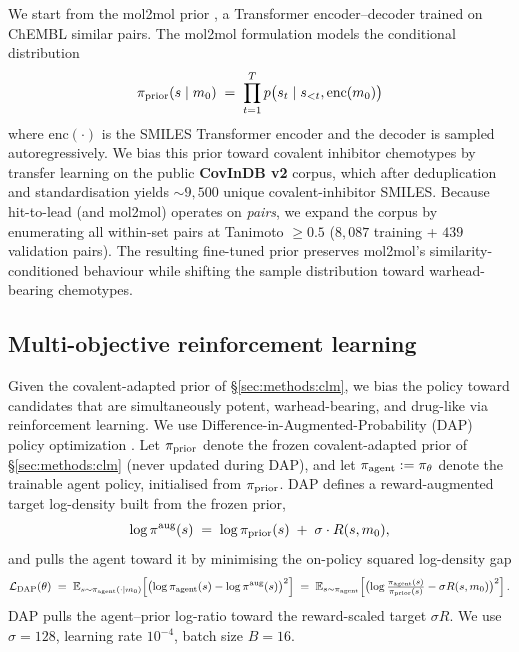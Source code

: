 We start from the mol2mol prior \cite{loeffler2024reinvent4,blaschke2020reinvent2}, a Transformer encoder--decoder trained on ChEMBL similar pairs. The mol2mol formulation models the conditional distribution
\[
\pi_{\text{prior}}(s \mid m_0) \;=\; \prod_{t=1}^{T} p\bigl(s_t \mid s_{<t}, \mathrm{enc}(m_0)\bigr)
\]
where $\mathrm{enc}(\cdot)$ is the SMILES Transformer encoder and the decoder is sampled autoregressively. We bias this prior toward covalent inhibitor chemotypes by transfer learning on the public \textbf{CovInDB v2} corpus, which after deduplication and standardisation yields $\sim$$9{,}500$ unique covalent-inhibitor SMILES. Because hit-to-lead (and mol2mol) operates on \emph{pairs}, we expand the corpus by enumerating all within-set pairs at Tanimoto $\ge 0.5$ ($8{,}087$ training + $439$ validation pairs). The resulting fine-tuned prior preserves mol2mol's similarity-conditioned behaviour while shifting the sample distribution toward warhead-bearing chemotypes.

\subsection{Multi-objective reinforcement learning}\label{sec:methods:rl}

Given the covalent-adapted prior of \S\ref{sec:methods:clm}, we bias the policy toward candidates that are simultaneously potent, warhead-bearing, and drug-like via reinforcement learning. We use Difference-in-Augmented-Probability (DAP) policy optimization \cite{olivecrona2017reinvent,blaschke2020reinvent2}. Let $\pi_{\text{prior}}$ denote the frozen covalent-adapted prior of \S\ref{sec:methods:clm} (never updated during DAP), and let $\pi_{\text{agent}} := \pi_\theta$ denote the trainable agent policy, initialised from $\pi_{\text{prior}}$. DAP defines a reward-augmented target log-density built from the frozen prior,
\[
\log \pi^{\text{aug}}(s) \;=\; \log \pi_{\text{prior}}(s) \;+\; \sigma \cdot R(s, m_0),
\]
and pulls the agent toward it by minimising the on-policy squared log-density gap
\[
\mathcal{L}_{\text{DAP}}(\theta) \;=\; \mathbb{E}_{s \sim \pi_{\text{agent}}(\cdot \mid m_0)} \!\left[ \bigl(\log \pi_{\text{agent}}(s) - \log \pi^{\text{aug}}(s) \bigr)^2 \right] \;=\; \mathbb{E}_{s \sim \pi_{\text{agent}}} \!\left[ \bigl( \log \tfrac{\pi_{\text{agent}}(s)}{\pi_{\text{prior}}(s)} - \sigma R(s, m_0) \bigr)^2 \right].
\]
DAP pulls the agent--prior log-ratio toward the reward-scaled target $\sigma R$. We use $\sigma = 128$, learning rate $10^{-4}$, batch size $B = 16$.

